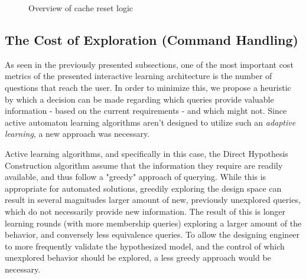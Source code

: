 \begin{figure}[!ht] 
	\centering
	\caption{Overview of cache reset logic} 
	\label{fig_architcture_ileoverview_cache}
\end{figure}

\subsection{The Cost of Exploration (Command Handling)} \label{subs_commandhandling}

As seen in the previously presented subsections, one of the most important cost metrics of the presented interactive learning architecture is the number of questions that reach the user. In order to minimize this, we propose a heuristic by which a decision can be made regarding which queries provide valuable information - based on the current requirements - and which might not. Since active automaton learning algorithms aren't designed to utilize such an \textit{adaptive learning}, a new approach was necessary. 

Active learning algorithms, and specifically in this case, the Direct Hypothesis Construction algorithm assume that the information they require are readily available, and thus follow a "greedy" approach of querying. While this is appropriate for automated solutions, greedily exploring the design space can result in several magnitudes larger amount of new, previously unexplored queries, which do not necessarily provide new information. The result of this is longer learning rounds (with more membership queries) exploring a larger amount of the behavior, and conversely less equivalence queries. To allow the designing engineer to more frequently validate the hypothesized model, and the control of which unexplored behavior should be explored, a less greedy approach would be necessary.

